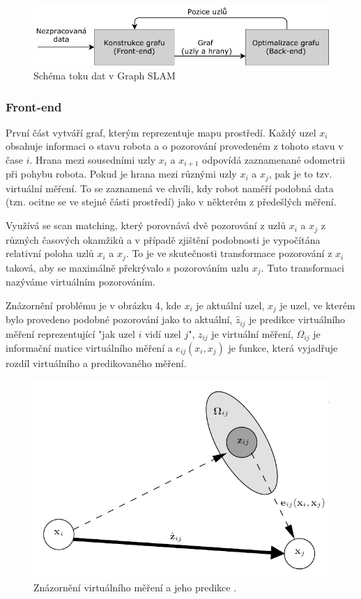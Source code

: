 \documentclass[12pt,a4paper]{article}
\begin{document}
\begin{figure}[H]
\centering
\includegraphics[scale=1.2]{img/Obr3.pdf}
\caption{Schéma toku dat v Graph SLAM}
\end{figure}

\subsubsection{Front-end}
První část vytváří graf, kterým reprezentuje mapu prostředí. Každý uzel $x_i$ obsahuje informaci o stavu robota a o pozorování provedeném z tohoto stavu v čase $i$. Hrana mezi sousedními uzly $x_i$ a $x_{i+1}$ odpovídá zaznamenané odometrii při pohybu robota. Pokud je hrana mezi různými uzly $x_i$ a $x_j$, pak je to tzv. virtuální měření. To se zaznamená ve chvíli, kdy robot naměří podobná data (tzn. ocitne se ve stejné části prostředí) jako v některém z předešlých měření. 

Využívá se scan matching, který porovnává dvě pozorování z uzlů $x_i$ a $x_j$ z různých časových okamžiků a v případě zjištění podobnosti je vypočítána relativní poloha uzlů $x_i$ a $x_j$. To je ve skutečnosti transformace pozorování z $x_i$ taková, aby se maximálně překrývalo s pozorováním uzlu $x_j$. Tuto transformaci nazýváme virtuálním pozorováním.

Znázornění problému je v obrázku 4, kde $x_i$ je aktuální uzel, $x_j$ je uzel, ve kterém bylo provedeno podobné pozorování jako to aktuální, $\hat{z}_{ij}$ je predikce virtuálního měření reprezentující "jak uzel $i$ vidí uzel $j$", $z_{ij}$ je virtuální měření, $\Omega_{ij}$ je informační matice virtuálního měření a $e_{ij}(x_i, x_j)$ je funkce, která vyjadřuje rozdíl virtuálního a predikovaného měření.
\begin{figure}[H]
\centering
\includegraphics[scale=0.8]{img/Obr4_b}
\caption{Znázornění virtuálního měření a jeho predikce \cite{tutorialGraph}.}
\end{figure}
\end{document}
